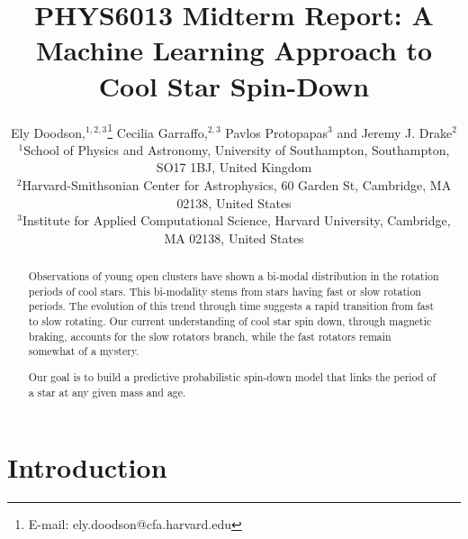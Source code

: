 \documentclass[fleqn,usenatbib]{mnras}
\title{PHYS6013 Midterm Report: A Machine Learning Approach to Cool Star Spin-Down}
\author[E. Doodson et al.]{
Ely Doodson,$^{1,2,3}$\thanks{E-mail: ely.doodson@cfa.harvard.edu}
Cecilia Garraffo,$^{2,3}$
Pavlos Protopapas$^{3}$
and Jeremy J. Drake$^{2}$
\\
$^{1}$School of Physics and Astronomy, University of Southampton,
Southampton, SO17 1BJ, United Kingdom\\
$^{2}$Harvard-Smithsonian Center for Astrophysics, 60 Garden St, Cambridge, MA 02138, United States \\
$^{3}$Institute for Applied Computational Science, Harvard University, Cambridge, MA 02138, United States
}
\begin{document}
\label{firstpage}
\pagerange{\pageref{firstpage}--\pageref{lastpage}}
\maketitle

\begin{abstract}
	Observations of young open clusters have shown a bi-modal distribution in the rotation periods of cool stars.
	This bi-modality stems from stars having fast or slow rotation periods.
	The evolution of this trend through time suggests a rapid transition from fast to slow rotating.
	Our current understanding of cool star spin down, through magnetic braking, accounts for the slow rotators branch, while the fast rotators remain somewhat of a mystery.

	Our goal is to build a predictive probabilistic spin-down model that links the period of a star at any given mass and age.
\end{abstract}


\section{Introduction}


\end{document}
